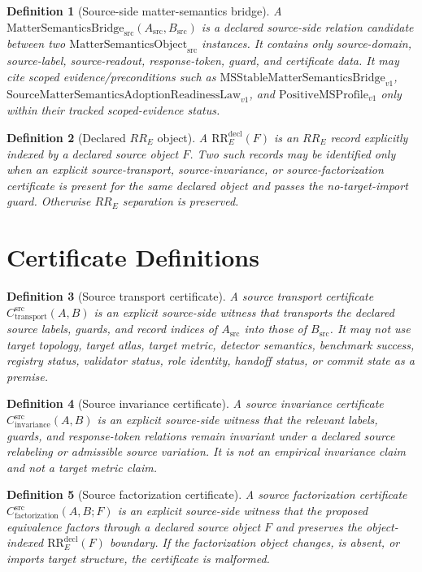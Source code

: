 \documentclass[11pt]{article}
\newcommand{\MSObj}{\mathrm{MatterSemanticsObject}_{\mathrm{src}}}
\newcommand{\MSBridgeSrc}{\mathrm{MatterSemanticsBridge}_{\mathrm{src}}}
\newcommand{\RREObj}{\mathrm{RR}_{E}^{\mathrm{decl}}}
\newcommand{\CTr}{C_{\mathrm{transport}}^{\mathrm{src}}}
\newcommand{\CInv}{C_{\mathrm{invariance}}^{\mathrm{src}}}
\newcommand{\CFact}{C_{\mathrm{factorization}}^{\mathrm{src}}}
\newcommand{\PositiveMSProfile}{\mathrm{PositiveMSProfile}_{v1}}
\newcommand{\SMSAR}{\mathrm{SourceMatterSemanticsAdoptionReadinessLaw}_{v1}}
\newcommand{\MSStable}{\mathrm{MSStableMatterSemanticsBridge}_{v1}}
\newtheorem{definition}{Definition}
\begin{document}
\begin{definition}[Source-side matter-semantics bridge]
A \(\MSBridgeSrc(A_{\mathrm{src}},B_{\mathrm{src}})\) is a declared
source-side relation candidate between two \(\MSObj\) instances. It contains
only source-domain, source-label, source-readout, response-token, guard, and
certificate data. It may cite scoped evidence/preconditions such as
\(\MSStable\), \(\SMSAR\), and \(\PositiveMSProfile\) only within their
tracked scoped-evidence status.
\end{definition}

\begin{definition}[Declared \(RR_E\) object]
A \(\RREObj(F)\) is an \(RR_E\) record explicitly indexed by a declared source
object \(F\). Two such records may be identified only when an explicit
source-transport, source-invariance, or source-factorization certificate is
present for the same declared object and passes the no-target-import guard.
Otherwise \(RR_E\) separation is preserved.
\end{definition}

\section{Certificate Definitions}

\begin{definition}[Source transport certificate]
A source transport certificate \(\CTr(A,B)\) is an explicit source-side
witness that transports the declared source labels, guards, and record indices
of \(A_{\mathrm{src}}\) into those of \(B_{\mathrm{src}}\). It may not use
target topology, target atlas, target metric, detector semantics, benchmark
success, registry status, validator status, role identity, handoff status, or
commit state as a premise.
\end{definition}

\begin{definition}[Source invariance certificate]
A source invariance certificate \(\CInv(A,B)\) is an explicit source-side
witness that the relevant labels, guards, and response-token relations remain
invariant under a declared source relabeling or admissible source variation.
It is not an empirical invariance claim and not a target metric claim.
\end{definition}

\begin{definition}[Source factorization certificate]
A source factorization certificate \(\CFact(A,B;F)\) is an explicit
source-side witness that the proposed equivalence factors through a declared
source object \(F\) and preserves the object-indexed \(\RREObj(F)\) boundary.
If the factorization object changes, is absent, or imports target structure,
the certificate is malformed.
\end{definition}
\end{document}

